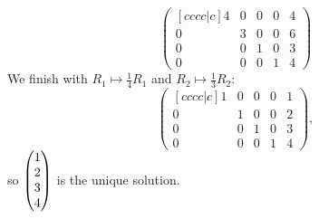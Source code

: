 \documentclass{article}
\begin{document}
\begin{Solution}
\[\begin{pmatrix}[cccc|c] 4 & 0 & 0 & 0 & 4 \\ 0 & 3 & 0 & 0 & 6
\\ 0 & 0 & 1 & 0 & 3 \\ 0 & 0 & 0 & 1 & 4\end{pmatrix}\] We finish
with \(R_1\mapsto \frac{1}{4}R_1\) and \(R_2\mapsto
\frac{1}{3}R_2\): \[\begin{pmatrix}[cccc|c] 1 & 0 & 0 & 0 & 1 \\ 0 &
1 & 0 & 0 & 2 \\ 0 & 0 & 1 & 0 & 3 \\ 0 & 0 & 0 & 1 &
4\end{pmatrix},\] so \(\begin{pmatrix} 1\\ 2 \\ 3 \\4\end{pmatrix}\) is the unique
solution.


\end{Solution}
\end{document}
